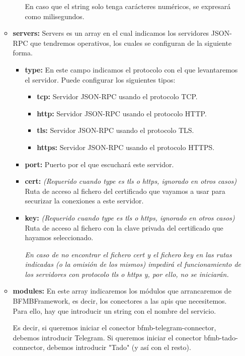 \documentclass[spanish,12pt, a4paper, twoside]{paper}
\begin{document}
\begin{enumerate}
\begin{itemize}
\begin{itemize}
En caso que el string solo tenga carácteres numéricos, se expresará como milisegundos.
\end{itemize}

\item\textbf{servers:} Servers es un array en el cual indicamos los servidores JSON-RPC que tendremos operativos, los cuales se configuran de la siguiente forma.
\begin{itemize}
\item\textbf{type:} En este campo indicamos el protocolo con el que levantaremos el servidor. Puede configurar los siguientes tipos:
\begin{itemize}
\item\textbf{tcp:} Servidor JSON-RPC usando el protocolo TCP.
\item\textbf{http:} Servidor JSON-RPC usando el protocolo HTTP.
\item\textbf{tls:} Servidor JSON-RPC usando el protocolo TLS.
\item\textbf{https:} Servidor JSON-RPC usando el protocolo HTTPS.
\end{itemize}

\item\textbf{port:} Puerto por el que escuchará este servidor.
\item\textbf{cert:} \emph{(Requerido cuando type es tls o https, ignorado en otros casos)} Ruta de acceso al fichero del certificado que vayamos a usar para securizar la conexiones a este servidor.
\item\textbf{key:} \emph{(Requerido cuando type es tls o https, ignorado en otros casos)} Ruta de acceso al fichero con la clave privada del certificado que hayamos seleccionado.

\emph{En caso de no encontrar el fichero cert y el fichero key en las rutas indicadas (o la omisión de los mismos) impedirá el funcionamiento de los servidores con protocolo tls o https y, por ello, no se iniciarán.}
\end{itemize}

\item\textbf{modules:} En este array indicaremos los módulos que arrancaremos de BFMBFramework, es decir, los conectores a las apis que necesitemos. Para ello, hay que introducir un string con el nombre del servicio.

Es decir, si queremos iniciar el conector bfmb-telegram-connector, debemos introducir Telegram. Si queremos iniciar el conector bfmb-tado-connector, debemos introducir "Tado" (y así con el resto).
\end{itemize}


\end{enumerate}
\end{document}
